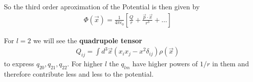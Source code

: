So the third order aproximation of the Potential is then given by
\begin{align*}
  \Phi(\vec{x}) = \frac{1}{4 \pi \epsilon_0} \left[
    \frac{Q}{r} + \frac{\vec{p} \cdot \vec{x}}{r^{3}} + \ldots
  \right]
\end{align*}

For $l = 2$ we will see the \textbf{quadrupole tensor}
\begin{align*}
  Q_{ij} = \int d^{3} \vec{x} (x_ix_j - x^{2}\delta_{ij})\rho(\vec{x})
\end{align*}
to express $q_{20},q_{21},q_{22}$.
For higher $l$ the $q_{lm}$ have higher powers of $1/r$ in them and therefore contribute less and less to the potential.






